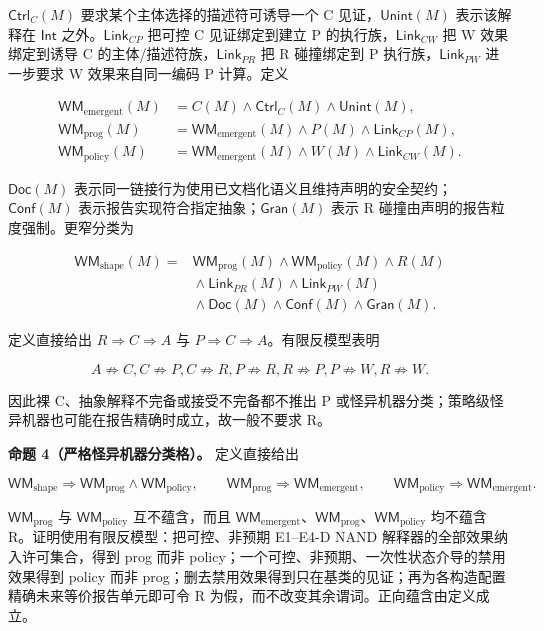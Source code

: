 \documentclass[
  11pt,
  a4paper,
]{ctexart}
\begin{document}
\(\mathsf{Ctrl}_C(M)\) 要求某个主体选择的描述符可诱导一个 C
见证，\(\mathsf{Unint}(M)\) 表示该解释在 \(\mathsf{Int}\)
之外。\(\mathsf{Link}_{CP}\) 把可控 C 见证绑定到建立 P
的执行族，\(\mathsf{Link}_{CW}\) 把 W 效果绑定到诱导 C
的主体/描述符族，\(\mathsf{Link}_{PR}\) 把 R 碰撞绑定到 P
执行族，\(\mathsf{Link}_{PW}\) 进一步要求 W 效果来自同一编码 P
计算。定义

\[\begin{aligned}
\mathsf{WM}_{\mathrm{emergent}}(M)
&=C(M)\land\mathsf{Ctrl}_C(M)\land\mathsf{Unint}(M),\\
\mathsf{WM}_{\mathrm{prog}}(M)
&=\mathsf{WM}_{\mathrm{emergent}}(M)\land P(M)\land\mathsf{Link}_{CP}(M),\\
\mathsf{WM}_{\mathrm{policy}}(M)
&=\mathsf{WM}_{\mathrm{emergent}}(M)\land W(M)\land\mathsf{Link}_{CW}(M).
\end{aligned}\]

\(\mathsf{Doc}(M)\)
表示同一链接行为使用已文档化语义且维持声明的安全契约；\(\mathsf{Conf}(M)\)
表示报告实现符合指定抽象；\(\mathsf{Gran}(M)\) 表示 R
碰撞由声明的报告粒度强制。更窄分类为

\[\begin{aligned}
\mathsf{WM}_{\mathrm{shape}}(M)={}&
\mathsf{WM}_{\mathrm{prog}}(M)\land\mathsf{WM}_{\mathrm{policy}}(M)\land R(M)\\
&{}\land\mathsf{Link}_{PR}(M)\land\mathsf{Link}_{PW}(M)\\
&{}\land\mathsf{Doc}(M)\land\mathsf{Conf}(M)\land\mathsf{Gran}(M).
\end{aligned}\]

定义直接给出 \(R\Rightarrow C\Rightarrow A\) 与
\(P\Rightarrow C\Rightarrow A\)。有限反模型表明

\[A\not\Rightarrow C,
C\not\Rightarrow P,
C\not\Rightarrow R,
P\not\Rightarrow R,
R\not\Rightarrow P,
P\not\Rightarrow W,
R\not\Rightarrow W.\]

因此裸 C、抽象解释不完备或接受不完备都不推出 P
或怪异机器分类；策略级怪异机器也可能在报告精确时成立，故一般不要求 R。

\textbf{命题 4（严格怪异机器分类格）。} 定义直接给出

\[\mathsf{WM}_{\mathrm{shape}}\Rightarrow
\mathsf{WM}_{\mathrm{prog}}\land\mathsf{WM}_{\mathrm{policy}},\qquad
\mathsf{WM}_{\mathrm{prog}}\Rightarrow\mathsf{WM}_{\mathrm{emergent}},\qquad
\mathsf{WM}_{\mathrm{policy}}\Rightarrow\mathsf{WM}_{\mathrm{emergent}}.\]

\(\mathsf{WM}_{\mathrm{prog}}\) 与 \(\mathsf{WM}_{\mathrm{policy}}\)
互不蕴含，而且
\(\mathsf{WM}_{\mathrm{emergent}}\)、\(\mathsf{WM}_{\mathrm{prog}}\)、\(\mathsf{WM}_{\mathrm{policy}}\)
均不蕴含 R。证明使用有限反模型：把可控、非预期 E1--E4-D NAND
解释器的全部效果纳入许可集合，得到 prog 而非
policy；一个可控、非预期、一次性状态介导的禁用效果得到 policy 而非
prog；删去禁用效果得到只在基类的见证；再为各构造配置精确未来等价报告单元即可令
R 为假，而不改变其余谓词。正向蕴含由定义成立。
\end{document}
